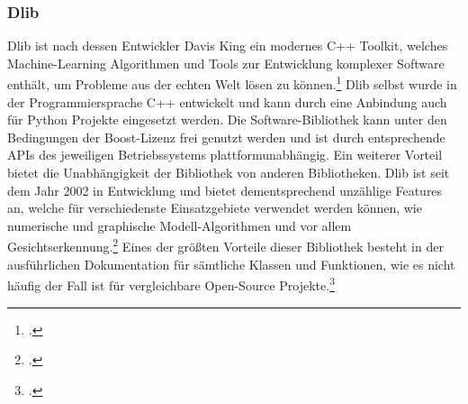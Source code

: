 \documentclass[12pt, a4paper]{report}
\begin{document}
\subsubsection{Dlib}
Dlib ist nach dessen Entwickler Davis King ein modernes C++ Toolkit, welches Machine-Learning Algorithmen und Tools zur Entwicklung komplexer Software enthält, um Probleme aus der echten Welt lösen zu können.\footcite[Vgl.]{netguru}
\newline
Dlib selbst wurde in der Programmiersprache C++ entwickelt und kann durch eine Anbindung auch für Python Projekte eingesetzt werden. Die Software-Bibliothek kann unter den Bedingungen der Boost-Lizenz frei genutzt werden und ist durch entsprechende APIs des jeweiligen Betriebssystems plattformunabhängig. Ein weiterer Vorteil bietet die Unabhängigkeit der Bibliothek von anderen Bibliotheken. %
Dlib ist seit dem Jahr 2002 in Entwicklung und bietet dementsprechend unzählige Features an, welche für verschiedenste Einsatzgebiete verwendet werden können, wie numerische und graphische Modell-Algorithmen und vor allem Gesichtserkennung.\footcite[Vgl.][]{netguru}
Eines der größten Vorteile dieser Bibliothek besteht in der ausführlichen Dokumentation für sämtliche Klassen und Funktionen, wie es nicht häufig der Fall ist für vergleichbare Open-Source Projekte.\footcite[Vgl.]{Dlib}
\end{document}
